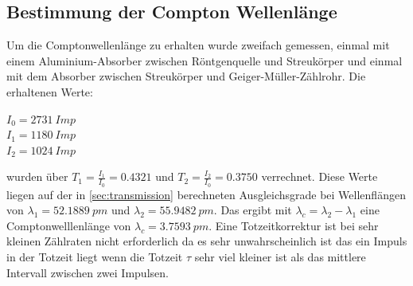 \subsection{Bestimmung der Compton Wellenlänge}
\label{sec:compton}
Um die Comptonwellenlänge zu erhalten wurde zweifach gemessen, einmal mit einem 
Aluminium-Absorber zwischen Röntgenquelle und Streukörper und einmal mit dem Absorber zwischen Streukörper
und Geiger-Müller-Zählrohr. Die erhaltenen Werte:
\begin{center}
    $I_0=\SI[]{2731}[]{Imp}$\\
    $I_1=\SI[]{1180}[]{Imp}$\\
    $I_2=\SI[]{1024}[]{Imp}$\\
\end{center}
wurden über $T_1=\frac{I_1}{I_0}=0.4321$ und $T_2=\frac{I_2}{I_0}=0.3750$ verrechnet. Diese Werte liegen auf der
in \autoref{sec:transmission} berechneten Ausgleichsgrade bei Wellenflängen von $\lambda_1=\SI[]{52.1889}[]{pm}$
und $\lambda_2=\SI[]{55.9482}[]{pm}$. Das ergibt mit $\lambda_c=\lambda_2 -\lambda_1$ eine Comptonwelllenlänge
von $\lambda_c=\SI[]{3.7593}[]{pm}$. Eine Totzeitkorrektur ist bei sehr kleinen Zählraten nicht erforderlich da 
es sehr unwahrscheinlich ist das ein Impuls in der Totzeit liegt wenn die Totzeit $\tau$ sehr viel kleiner ist
als das mittlere Intervall zwischen zwei Impulsen.